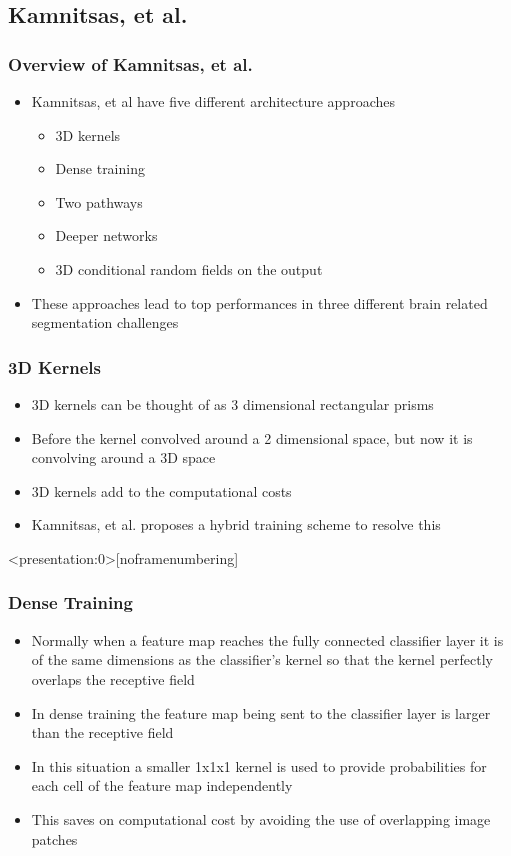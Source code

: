 \documentclass{beamer}
\begin{document}
\subsection*{Kamnitsas, et al.}

\begin{frame}
  \frametitle{Overview of Kamnitsas, et al.}
  \begin{itemize}
	\item Kamnitsas, et al have five different architecture approaches
	\begin{itemize}
	  \item<1,2> 3D kernels
	  \item<1> Dense training
	  \item<1,2> Two pathways
	  \item<1,2> Deeper networks
	  \item<1> 3D conditional random fields on the output
	\end{itemize}
	\item These approaches lead to top performances in three different brain related segmentation challenges
  \end{itemize}
\end{frame}

\begin{frame}
  \frametitle{3D Kernels}
  \begin{itemize}
	\item 3D kernels can be thought of as 3 dimensional rectangular prisms
	\item Before the kernel convolved around a 2 dimensional space, but now it is convolving around a 3D space
	\item 3D kernels add to the computational costs
	\item Kamnitsas, et al. proposes a hybrid training scheme to resolve this
  \end{itemize}
\end{frame}

\begin{frame}<presentation:0>[noframenumbering]
  \frametitle{Dense Training}
  \begin{itemize}
	\item Normally when a feature map reaches the fully connected classifier layer it is of the same dimensions as the classifier's kernel so that the kernel perfectly overlaps the receptive field
	\item In dense training the feature map being sent to the classifier layer is larger than the receptive field
	\item In this situation a smaller 1x1x1 kernel is used to provide probabilities for each cell of the feature map independently
	\item This saves on computational cost by avoiding the use of overlapping image patches
  \end{itemize}
\end{frame}
\end{document}
